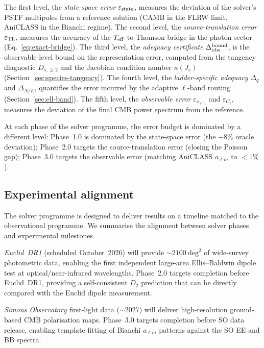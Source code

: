 The first level, the \emph{state-space error}
$\varepsilon_{\rm state}$, measures the deviation of the
solver's PSTF multipoles from a reference solution (CAMB
in the FLRW limit, AniCLASS in the Bianchi regime).  The
second level, the \emph{source-translation error}
$\varepsilon_{\rm Th}$, measures the accuracy of the
$T_{\mathrm{eff}}$-to-Thomson bridge in the photon sector
(Eq.~\ref{eq:exact-bridge}).  The third level, the
\emph{adequacy certificate} $\Delta_{\rm obs}^{\rm bound}$,
is the observable-level bound on the representation error,
computed from the tangency diagnostic $D_{s,\geq 2}$
and the Jacobian condition number $\kappa(J_s)$
(Section~\ref{sec:species-tangency}).  The fourth level,
the \emph{ladder-specific adequacy} $\Delta_q$ and
$\Delta_{N/E}$, quantifies the error incurred by the
adaptive $\ell$-band routing
(Section~\ref{sec:ell-band}).  The fifth level, the
\emph{observable error} $\varepsilon_{a_{\ell m}}$ and
$\varepsilon_{C_\ell}$, measures the deviation of the
final CMB power spectrum from the reference.

At each phase of the solver programme, the error budget
is dominated by a different level: Phase~1.0 is dominated
by the state-space error (the $-8\%$ oracle deviation);
Phase~2.0 targets the source-translation error (closing
the Poisson gap); Phase~3.0 targets the observable error
(matching AniCLASS $a_{\ell m}$ to $< 1\%$).


\subsection{Experimental alignment}
\label{sec:experimental-alignment}

The solver programme is designed to deliver results on a
timeline matched to the observational programme.  We
summarise the alignment between solver phases and
experimental milestones.

\emph{Euclid~DR1} (scheduled October~2026) will provide
$\sim\!2100~\mathrm{deg}^2$ of wide-survey photometric
data, enabling the first independent large-area
Ellis--Baldwin dipole test at optical/near-infrared
wavelengths.  Phase~2.0 targets completion before
Euclid~DR1, providing a self-consistent $D_2$ prediction
that can be directly compared with the Euclid dipole
measurement.

\emph{Simons Observatory} first-light data
($\sim\!2027$) will deliver high-resolution ground-based
CMB polarisation maps.  Phase~3.0 targets completion
before SO data release, enabling template fitting of
Bianchi $a_{\ell m}$ patterns against the SO EE and BB
spectra.

